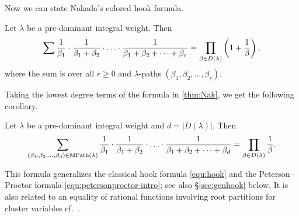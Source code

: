 Now we can state Nakada's colored hook formula.
\begin{theorem}\label{thm:Nak}
	
	Let $\lambda$ be a pre-dominant integral weight. Then 
	$$
	\sum \frac{1}{\beta_1}\cdot \frac{1}{\beta_1+\beta_2}\cdot \ldots \cdot\frac{1}{\beta_1+\beta_2+\cdots +\beta_r}
	=\prod_{\beta\in D(\lambda)}\left(1+\frac{1}{\beta}\right) \/, 
	$$ where the sum is over all $r \ge 0$ and $\lambda$-paths $(\beta_1,\beta_2,\ldots,\beta_r)$.
\end{theorem}

Taking the lowest degree terms of the formula in \cref{thm:Nak},
we get the following corollary.
\begin{corol}
	Let $\lambda$ be a pre-dominant integral weight and $d=|D(\lambda)|$.
	Then 
	$$
	\sum_{
		(\beta_{1},\beta_{2},\ldots,\beta_d)\in {\rm MPath}(\lambda)}
	\frac{1}{\beta_1}\cdot \frac{1}{\beta_1+\beta_2}\cdot \ldots \cdot\frac{1}{\beta_1+\beta_2+\cdots +\beta_d}
	=\prod_{\beta\in D(\lambda)}\frac{1}{\beta}.
	$$
\end{corol}
This formula generalizes the classical hook formula \eqref{equ:hook} and the Peterson--Proctor formula \eqref{equ:petersonproctor-intro}; see also \S\ref{sec:genhook} below. It is also related to an equality of rational functions involving root partitions for cluster variables cf.~\cite{Cas19,casbi2019newton}.

